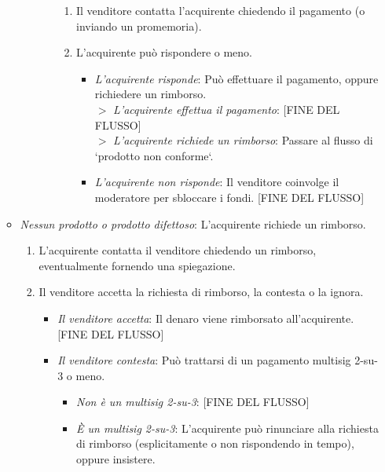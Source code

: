 \begin{enumerate}
\begin{itemize}
\begin{itemize}
\begin{itemize}
                \begin{enumerate}
                    \item Il venditore contatta l'acquirente chiedendo il pagamento (o inviando un promemoria).
                    \item L'acquirente può rispondere o meno.
                    \begin{itemize}
                        \item {\em L'acquirente risponde}: Può effettuare il pagamento, oppure richiedere un rimborso.\\
                        $>$ {\em L'acquirente effettua il pagamento}: [FINE DEL FLUSSO]\\
                        $>$ {\em L'acquirente richiede un rimborso}: Passare al flusso di `prodotto non conforme`.
                        \item {\em L'acquirente non risponde}: Il venditore coinvolge il moderatore per sbloccare i fondi. [FINE DEL FLUSSO]
                    \end{itemize}{}
                \end{enumerate}{}
            \end{itemize}
        \end{itemize}{}
        \item {\em Nessun prodotto o prodotto difettoso}: L'acquirente richiede un rimborso.
        \begin{enumerate}
            \item L'acquirente contatta il venditore chiedendo un rimborso, eventualmente fornendo una spiegazione.
            \item Il venditore accetta la richiesta di rimborso, la contesta o la ignora.
            \begin{itemize}
                \item {\em Il venditore accetta}: Il denaro viene rimborsato all'acquirente. [FINE DEL FLUSSO]
                \item {\em Il venditore contesta}: Può trattarsi di un pagamento multisig 2-su-3 o meno.
                \begin{itemize}
                    \item {\em Non è un multisig 2-su-3}: [FINE DEL FLUSSO]
                    \item {\em È un multisig 2-su-3}: L'acquirente può rinunciare alla richiesta di rimborso (esplicitamente o non rispondendo in tempo), oppure insistere.
                    \begin{itemize}

\end{itemize}
\end{itemize}
\end{itemize}
\end{enumerate}
\end{itemize}
\end{enumerate}
